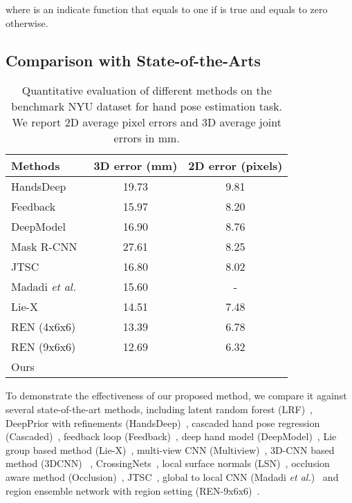 \documentclass[final, 5p]{elsarticle}
\begin{document}
where  is an indicate function that equals to one if  is true and equals to zero otherwise.

\subsection{Comparison with State-of-the-Arts}

\begin{table}[!tb]
\centering
\caption{Quantitative evaluation of different methods on the benchmark NYU dataset for hand pose estimation task. We report 2D average pixel errors and 3D average joint errors in mm.}
\vspace{0.1cm}
\label{tab:table-nyu}
\begin{tabular}{lcc}
\hline
Methods& 3D error (mm) & 2D error (pixels) \\\hline
HandsDeep~\cite{oberweger2015hands} & 19.73 & 9.81 \\
Feedback~\cite{oberweger2015training} & 15.97 & 8.20\\
DeepModel~\cite{zhou2016model} & 16.90 & 8.76\\
Mask R-CNN~\cite{he2017mask} & 27.61 & 8.25\\
JTSC~\cite{fourure2017multi} & 16.80 & 8.02\\
Madadi \textit{et al.}~\cite{madadi2017end} & 15.60&- \\
Lie-X~\cite{Xu2017} & 14.51 & 7.48\\
REN (4x6x6)~\cite{guo2017region} & 13.39 & 6.78\\
REN (9x6x6)~\cite{wang2018region} & 12.69 & 6.32\\\hline
Ours &  & \\\hline
\end{tabular}
\end{table}

To demonstrate the effectiveness of our proposed method, we compare it against several state-of-the-art methods, including latent random forest (LRF)~\cite{tang2014latent}, DeepPrior with refinements (HandsDeep)~\cite{oberweger2015hands}, cascaded hand pose regression (Cascaded)~\cite{sun2015cascaded}, feedback loop (Feedback)~\cite{oberweger2015training}, deep hand model (DeepModel)~\cite{zhou2016model}, Lie group based method (Lie-X)~\cite{Xu2017}, multi-view CNN (Multiview)~\cite{ge2016robust}, 3D-CNN based method (3DCNN)~\cite{ge2017threedcnn} , CrossingNets~\cite{wan2017crossing}, local surface normals (LSN)~\cite{wan2016hand}, occlusion aware method (Occlusion)~\cite{madadi2017occlusion}, JTSC~\cite{fourure2017multi}, global to local CNN (Madadi \textit{et al.})~\cite{madadi2017end} and region ensemble network with  region setting (REN-9x6x6)~\cite{wang2018region}.
\end{document}

